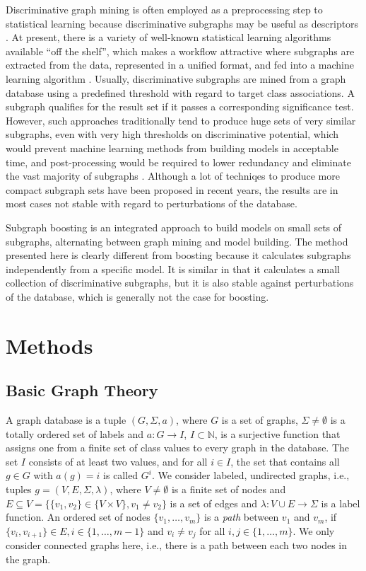 \documentclass{sig-alternate}
\begin{document}
Discriminative graph mining is often employed as a preprocessing step to
statistical learning because discriminative subgraphs may be useful as descriptors
\cite{bringmann10lego}. At present, there is a variety of well-known statistical
learning algorithms available ``off the shelf'', which makes a workflow
attractive where subgraphs are extracted from the data, represented in a
unified format, and fed into a machine learning algorithm \cite{KRH01}.
Usually, discriminative subgraphs are mined from a graph database using a
predefined threshold with regard to target class associations. A subgraph
qualifies for the result set if it passes a corresponding significance test.
However, such approaches traditionally tend to produce huge sets of very similar subgraphs,
even with very high thresholds on discriminative potential, which would prevent
machine learning methods from building models in acceptable time, and post-processing 
would be required to lower redundancy and eliminate the vast
majority of subgraphs \cite{Jun04Spin}. 
Although a lot of techniqes to produce more compact subgraph sets have been proposed in recent years, the
results are in most cases not stable with regard to perturbations of the database.

Subgraph boosting \cite{saigo09gboost} is an integrated approach to build models on
small sets of subgraphs, alternating between graph mining and model building. The method presented here is clearly
different from boosting because it calculates subgraphs independently from a specific model. It is similar in that it calculates a small
collection of discriminative subgraphs, but it is also stable against
perturbations of the database, which is generally not the case for boosting.


\section{Methods}
\label{s:Methods}

\subsection{Basic Graph Theory}
\label{ss:BasicGraphTheory}
A graph database is a tuple $(G, \Sigma, a)$, where $G$ is a set of graphs,
$\Sigma \ne \emptyset$  is a totally ordered set of labels and $a: G
\rightarrow I$, $I \subset \mathbb{N}$, is a surjective function that assigns one from a
finite set of class values to every graph in the database. The set 
$I$ consists of at least two values, and for all $i \in I$, the set that contains all $g \in G$
with $a(g)=i$ is called $G^i$. We consider labeled, undirected
graphs, i.e., tuples $g=(V,E,\Sigma,\lambda)$, where $V\ne \emptyset$ is a
finite set of nodes and $E \subseteq V = \{\{v_1, v_2\} \in \{V \times V\}, v_1
\ne v_2\}$ is a set of edges and $\lambda: V\cup E \rightarrow \Sigma$ is a
label function. 
An ordered set of nodes $\{ v_1, \ldots, v_m\}$ is a \emph{path} between $v_1$ and $v_m$, if $\{v_i, v_{i+1}\} \in E, i \in \{1,\ldots,m-1\}$ and $v_i \neq v_j$ for all $i,j\in \{1,\ldots,m\}$.
We only consider connected graphs here, i.e., there is a path
between each two nodes in the graph.
\end{document}
